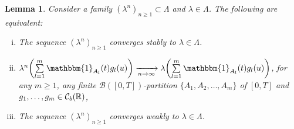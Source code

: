 \documentclass[12pt]{article}
\newtheorem{lemma}[prop]{Lemma}
\theoremstyle{named}
\numberwithin{equation}{section}
\newcommand{\real}{\mathbb{R}}
\begin{document}
\begin{lemma}\label{equivalence stable weak}
  Consider a family $( \lambda^n )_{n\geq 1} \subset \Lambda$ and $\lambda \in \Lambda$.
  The following are equivalent:
\begin{enumerate}[i)]
\item The sequence $(\lambda^n)_{n\geq 1}$ converges stably to $\lambda \in \Lambda$.
\item $\lambda^n\biggl(
    \sum\limits_{l=1}^{m} \mathbbm{1}_{A_l}(t) g_l(u)\biggr)
    \xrightarrow[n \to \infty]{} \lambda \biggl(
    \sum\limits_{l=1}^{m} \mathbbm{1}_{A_l}(t) g_l(u)\biggr)$,
    for any $m \geq 1$, any finite $\mathcal{B}([0,T])$-partition
    $\bigl\{A_1, A_2, \ldots , A_m\bigr\}$
    of $[0,T]$ and
    $g_1,\ldots , g_m \in {\cal C}_b(\real )$,
  \item The sequence $(\lambda^n)_{n\geq 1}$ converges weakly to $\lambda \in \Lambda$.
\end{enumerate}
\end{lemma}
\end{document}
